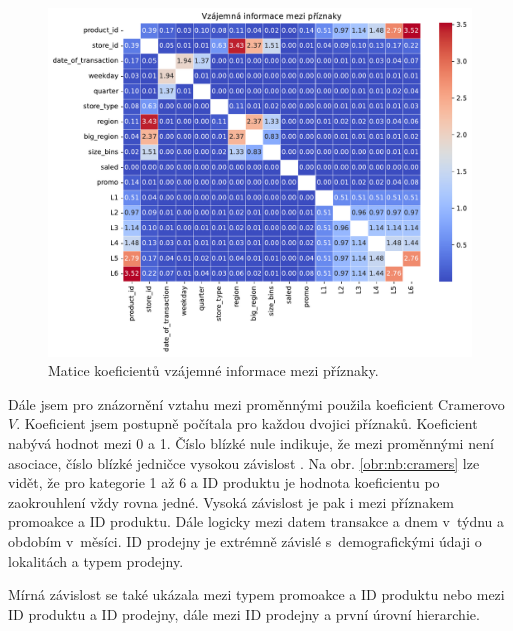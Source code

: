 \begin{figure}[h!]
    \centering
    \includegraphics[width=\textwidth]{obrazky/pripravadat/matrix_MI-everything-SFF-storesFETURES-002.pdf}
    \caption{Matice koeficientů vzájemné informace mezi příznaky.}
    \label{obr:nb:MI}
\end{figure}

Dále jsem pro znázornění vztahu mezi proměnnými použila koeficient Cramerovo $V$. Koeficient jsem postupně počítala pro každou dvojici příznaků. Koeficient nabývá hodnot mezi 0 a 1. Číslo blízké nule indikuje, že mezi proměnnými není asociace, číslo blízké jedničce vysokou závislost \cite{bib:statology}. Na obr. \ref*{obr:nb:cramers} lze vidět, že pro kategorie 1 až 6 a ID produktu je hodnota koeficientu po zaokrouhlení vždy rovna jedné. Vysoká závislost je pak i mezi příznakem promoakce a ID produktu. Dále logicky mezi datem transakce a dnem v~týdnu a obdobím v~měsíci. ID prodejny je extrémně závislé s~demografickými údaji o lokalitách a typem prodejny.

Mírná závislost se také ukázala mezi typem promoakce a ID produktu nebo mezi ID produktu a ID prodejny, dále mezi ID prodejny a první úrovní hierarchie.

